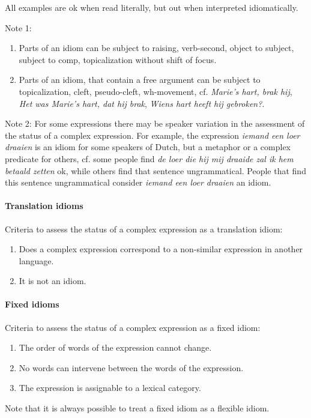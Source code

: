 All examples are ok when read literally, but out when interpreted
idiomatically.

Note 1:
\begin{enumerate}
  \item Parts of an idiom can be subject to raising, verb-second, object to 
subject, subject to comp, topicalization without shift of focus.
  \item Parts of an idiom, that contain a free argument can be subject to 
topicalization, cleft, pseudo-cleft, wh-movement, cf. {\em Marie's hart, brak
hij}, {\em Het was Marie's hart, dat hij brak}, {\em Wiens hart heeft hij
gebroken?}. 
\end{enumerate}

Note 2:
For some expressions there may be speaker variation in the assessment of the 
status of a complex expression. For example, the expression {\em iemand een 
loer draaien} is an idiom for some speakers of Dutch, but a metaphor or a 
complex predicate for others, cf. some people find {\em de loer die hij mij
draaide zal ik hem betaald zetten} ok, while others find that sentence
ungrammatical. People that find this sentence ungrammatical consider {\em 
iemand een loer draaien} an idiom.

\paragraph{Translation idioms}
Criteria to assess the status of a complex expression as a translation idiom:
\begin{enumerate}
  \item Does a complex expression correspond to a non-similar expression in
another language. 
  \item It is not an idiom. 
\end{enumerate}

\paragraph{Fixed idioms}
Criteria to assess the status of a complex expression as a fixed idiom:
\begin{enumerate}
  \item The order of words of the expression cannot change. 
  \item No words can intervene between the words of the expression.
  \item The expression is assignable to a lexical category. 
\end{enumerate}
Note that it is always possible to treat a fixed idiom as a flexible idiom.


